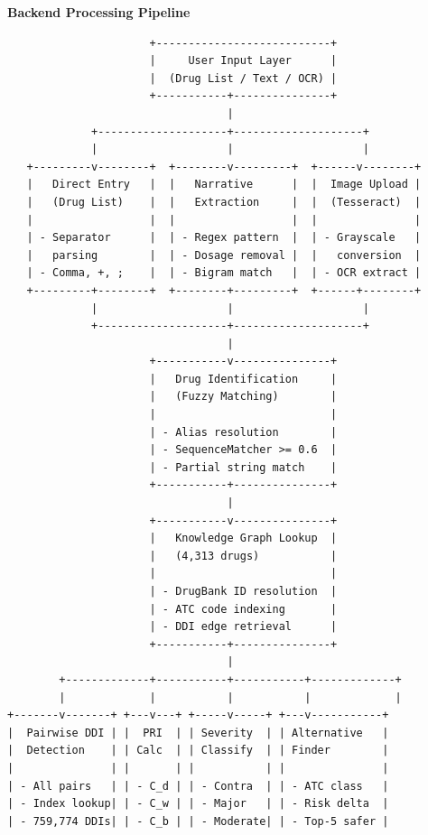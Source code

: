 \documentclass[12pt,a4paper]{article}
\begin{document}
\noindent\textbf{Backend Processing Pipeline}

\begin{verbatim}
                      +---------------------------+
                      |     User Input Layer      |
                      |  (Drug List / Text / OCR) |
                      +-----------+---------------+
                                  |
             +--------------------+--------------------+
             |                    |                    |
   +---------v--------+  +--------v---------+  +------v--------+
   |   Direct Entry   |  |   Narrative      |  |  Image Upload |
   |   (Drug List)    |  |   Extraction     |  |  (Tesseract)  |
   |                  |  |                  |  |               |
   | - Separator      |  | - Regex pattern  |  | - Grayscale   |
   |   parsing        |  | - Dosage removal |  |   conversion  |
   | - Comma, +, ;    |  | - Bigram match   |  | - OCR extract |
   +---------+--------+  +--------+---------+  +------+--------+
             |                    |                    |
             +--------------------+--------------------+
                                  |
                      +-----------v---------------+
                      |   Drug Identification     |
                      |   (Fuzzy Matching)        |
                      |                           |
                      | - Alias resolution        |
                      | - SequenceMatcher >= 0.6  |
                      | - Partial string match    |
                      +-----------+---------------+
                                  |
                      +-----------v---------------+
                      |   Knowledge Graph Lookup  |
                      |   (4,313 drugs)           |
                      |                           |
                      | - DrugBank ID resolution  |
                      | - ATC code indexing       |
                      | - DDI edge retrieval      |
                      +-----------+---------------+
                                  |
        +-------------+-----------+-----------+-------------+
        |             |           |           |             |
+-------v-------+ +---v---+ +-----v-----+ +---v-----------+ 
|  Pairwise DDI | |  PRI  | | Severity  | | Alternative   |
|  Detection    | | Calc  | | Classify  | | Finder        |
|               | |       | |           | |               |
| - All pairs   | | - C_d | | - Contra  | | - ATC class   |
| - Index lookup| | - C_w | | - Major   | | - Risk delta  |
| - 759,774 DDIs| | - C_b | | - Moderate| | - Top-5 safer |

\end{verbatim}
\end{document}
